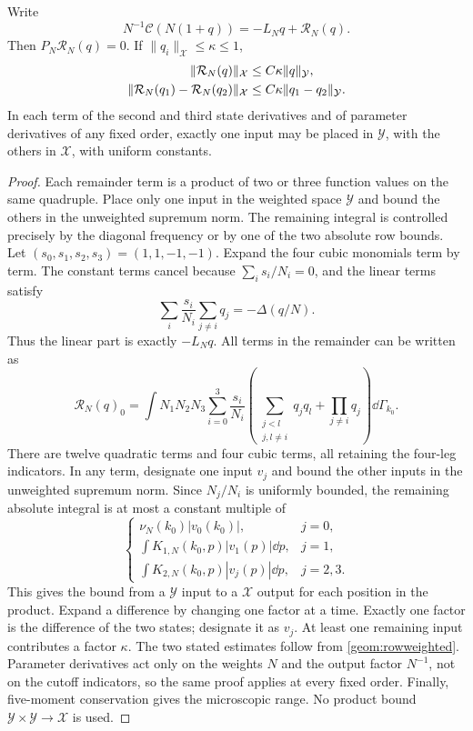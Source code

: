 \begin{lemma}\label{geom:remainder}
Write
\[
 N^{-1}\mathcal C(N(1+q))=-L_Nq+\mathcal R_N(q).
\]
Then $P_N\mathcal R_N(q)=0$. If $\|q_i\|_{\mathcal X}\le\kappa\le1$,
\begin{align}
 \|\mathcal R_N(q)\|_{\mathcal X}&\le C\kappa\|q\|_{\mathcal Y},\notag\\
 \|\mathcal R_N(q_1)-\mathcal R_N(q_2)\|_{\mathcal X}
     &\le C\kappa\|q_1-q_2\|_{\mathcal Y}.\label{geom:remainderbound}
\end{align}
In each term of the second and third state derivatives and of parameter
derivatives of any fixed order, exactly one input may be placed in
$\mathcal Y$, with the others in $\mathcal X$, with uniform constants.
\end{lemma}
\begin{proof}
Each remainder term is a product of two or three function values on the
same quadruple. Place only one input in the weighted space $\mathcal Y$
and bound the others in the unweighted supremum norm.
The remaining integral is controlled precisely by the diagonal frequency
or by one of the two absolute row bounds.
Let $(s_0,s_1,s_2,s_3)=(1,1,-1,-1)$. Expand the four cubic monomials
term by term. The constant terms cancel because $\sum_i s_i/N_i=0$,
and the linear terms satisfy
\[
 \sum_i\frac{s_i}{N_i}\sum_{j\ne i}q_j=-\Delta(q/N).
\]
Thus the linear part is exactly $-L_Nq$.
All terms in the remainder can be written as
\[
 \mathcal R_N(q)_0=\int N_1N_2N_3
 \sum_{i=0}^3\frac{s_i}{N_i}
 \left(\sum_{\substack{j<l\\j,l\ne i}}q_jq_l
                         +\prod_{j\ne i}q_j\right)\dd\Gamma_{k_0}.
\]
There are twelve quadratic terms and four cubic terms, all retaining
the four-leg indicators.
In any term, designate one input $v_j$ and bound the other inputs in
the unweighted supremum norm. Since $N_j/N_i$ is uniformly bounded,
the remaining absolute integral is at most a constant multiple of
\[
 \begin{cases}
  \nu_N(k_0)|v_0(k_0)|,&j=0,\\
  \displaystyle\int K_{1,N}(k_0,p)|v_1(p)|\dd p,&j=1,\\
  \displaystyle\int K_{2,N}(k_0,p)|v_j(p)|\dd p,&j=2,3.
 \end{cases}
\]
This gives the bound from a $\mathcal Y$ input to a $\mathcal X$ output
for each position in the product.
Expand a difference by changing one factor at a time. Exactly one factor
is the difference of the two states; designate it as $v_j$.
At least one remaining input contributes a factor $\kappa$.
The two stated estimates follow from \eqref{geom:rowweighted}.
Parameter derivatives act only on the weights $N$ and the output
factor $N^{-1}$, not on the cutoff indicators, so the same proof applies
at every fixed order. Finally, five-moment conservation gives the
microscopic range. No product bound
$\mathcal Y\times\mathcal Y\to\mathcal X$ is used.
\end{proof}

